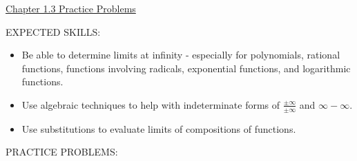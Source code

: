 \documentclass[12pt]{article}
\begin{document}
\begin{center}
\underline{\LARGE{Chapter 1.3 Practice Problems}}
\end{center}

\noindent EXPECTED SKILLS:

\begin{itemize}

\item Be able to determine limits at infinity - especially for polynomials, rational functions, functions involving radicals, exponential functions, and logarithmic functions.

\item Use algebraic techniques to help with indeterminate forms of $\displaystyle \frac{\pm\infty}{\pm\infty}$ and $\infty-\infty$.

\item Use substitutions to evaluate limits of compositions of functions.

\end{itemize}

\noindent PRACTICE PROBLEMS:
\end{document}
